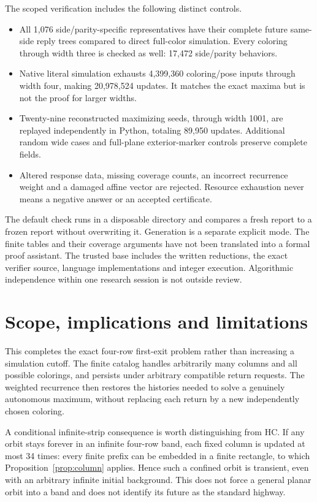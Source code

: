 \documentclass[11pt]{article}
\theoremstyle{definition}\newtheorem{definition}[theorem]{Definition}
\begin{document}
The scoped verification includes the following distinct controls.
\begin{itemize}
\item All 1,076 side/parity-specific representatives have their complete future
same-side reply trees compared to direct full-color simulation. Every coloring
through width three is checked as well: 17,472 side/parity behaviors.
\item Native literal simulation exhausts 4,399,360 coloring/pose inputs through
width four, making 20,978,524 updates. It matches the exact maxima but is not the
proof for larger widths.
\item Twenty-nine reconstructed maximizing seeds, through width 1001, are
replayed independently in Python, totaling 89,950 updates. Additional random
wide cases and full-plane exterior-marker controls preserve complete fields.
\item Altered response data, missing coverage counts, an incorrect recurrence
weight and a damaged affine vector are rejected. Resource exhaustion never
means a negative answer or an accepted certificate.
\end{itemize}

The default check runs in a disposable directory and compares a fresh report
to a frozen report without overwriting it. Generation is a separate explicit
mode. The finite tables and their coverage arguments have not been translated
into a formal proof assistant. The trusted base includes the written reductions,
the exact verifier source, language implementations and integer execution.
Algorithmic independence within one research session is not outside review.

\section{Scope, implications and limitations}
This completes the exact four-row first-exit problem rather than increasing
a simulation cutoff. The finite catalog handles arbitrarily many columns and
all possible colorings, and persists under arbitrary compatible return requests.
The weighted recurrence then restores the histories needed to solve a genuinely
autonomous maximum, without replacing each return by a new independently
chosen coloring.

A conditional infinite-strip consequence is worth distinguishing from HC.
If any orbit stays forever in an infinite four-row band, each fixed column is
updated at most 34 times: every finite prefix can be embedded in a finite
rectangle, to which Proposition~\ref{prop:column} applies. Hence such a confined
orbit is transient, even with an arbitrary infinite initial background. This
does not force a general planar orbit into a band and does not identify its
future as the standard highway.
\end{document}
